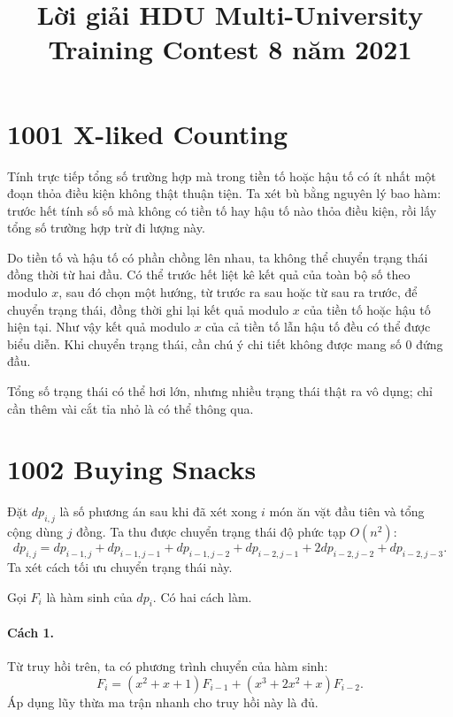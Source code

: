 \documentclass[11pt]{article}
\title{Lời giải HDU Multi-University Training Contest 8 năm 2021}
\author{}
\date{}
\begin{document}
\maketitle


\section*{1001 X-liked Counting}

Tính trực tiếp tổng số trường hợp mà trong tiền tố hoặc hậu tố có ít nhất một
đoạn thỏa điều kiện không thật thuận tiện. Ta xét bù bằng nguyên lý bao hàm:
trước hết tính số số mà không có tiền tố hay hậu tố nào thỏa điều kiện, rồi
lấy tổng số trường hợp trừ đi lượng này.

Do tiền tố và hậu tố có phần chồng lên nhau, ta không thể chuyển trạng thái
đồng thời từ hai đầu. Có thể trước hết liệt kê kết quả của toàn bộ số theo
modulo $x$, sau đó chọn một hướng, từ trước ra sau hoặc từ sau ra trước, để
chuyển trạng thái, đồng thời ghi lại kết quả modulo $x$ của tiền tố hoặc hậu
tố hiện tại. Như vậy kết quả modulo $x$ của cả tiền tố lẫn hậu tố đều có thể
được biểu diễn. Khi chuyển trạng thái, cần chú ý chi tiết không được mang số
$0$ đứng đầu.

Tổng số trạng thái có thể hơi lớn, nhưng nhiều trạng thái thật ra vô dụng; chỉ
cần thêm vài cắt tỉa nhỏ là có thể thông qua.

\section*{1002 Buying Snacks}

Đặt $dp_{i,j}$ là số phương án sau khi đã xét xong $i$ món ăn vặt đầu tiên và
tổng cộng dùng $j$ đồng. Ta thu được chuyển trạng thái độ phức tạp $O(n^2)$:
\[
  dp_{i,j}
  = dp_{i-1,j}+dp_{i-1,j-1}+dp_{i-1,j-2}
    +dp_{i-2,j-1}+2dp_{i-2,j-2}+dp_{i-2,j-3}.
\]
Ta xét cách tối ưu chuyển trạng thái này.

Gọi $F_i$ là hàm sinh của $dp_i$. Có hai cách làm.

\paragraph{Cách 1.}
Từ truy hồi trên, ta có phương trình chuyển của hàm sinh:
\[
  F_i=(x^2+x+1)F_{i-1}+(x^3+2x^2+x)F_{i-2}.
\]
Áp dụng lũy thừa ma trận nhanh cho truy hồi này là đủ.
\end{document}
